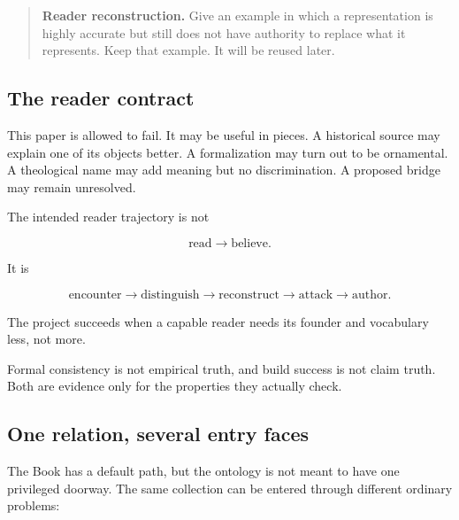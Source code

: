 \documentclass[11pt]{article}
\newenvironment{readercheck}{\begin{quote}\small\noindent\textbf{Reader reconstruction.}\;}{\end{quote}}
\begin{document}
\begin{readercheck}
Give an example in which a representation is highly accurate but still does not have authority to replace what it represents. Keep that example. It will be reused later.
\end{readercheck}

\subsection{The reader contract}

This paper is allowed to fail. It may be useful in pieces. A historical source may explain one of its objects better. A formalization may turn out to be ornamental. A theological name may add meaning but no discrimination. A proposed bridge may remain unresolved.

The intended reader trajectory is not

\begin{equation}
\text{read}\rightarrow\text{believe}.
\end{equation}

It is

\begin{equation}
\text{encounter}\rightarrow\text{distinguish}\rightarrow\text{reconstruct}
\rightarrow\text{attack}\rightarrow\text{author}.
\end{equation}

The project succeeds when a capable reader needs its founder and vocabulary less, not more.

Formal consistency is not empirical truth, and build success is not claim truth. Both are evidence only for the properties they actually check.

\subsection{One relation, several entry faces}

The Book has a default path, but the ontology is not meant to have one privileged doorway. The same collection can be entered through different ordinary problems:
\end{document}

